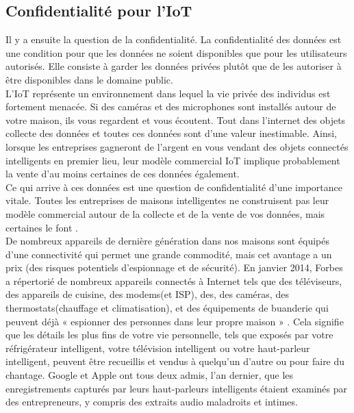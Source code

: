 	\subsection{Conf{\kern0pt}identialité pour l’IoT}
Il y a ensuite la question de la conf{\kern0pt}identialité. La conf{\kern0pt}identialité des données est une condition pour que les données ne soient disponibles que pour les utilisateurs autorisés. Elle consiste à garder les données privées plutôt que de les autoriser à être disponibles dans le domaine public.\\

L’IoT représente un environnement dans lequel la vie privée des individus est fortement menacée. Si des caméras et des microphones sont installés autour de votre maison, ils vous regardent et vous écoutent. Tout dans l'internet des objets collecte des données et toutes ces données sont d’une valeur inestimable. Ainsi, lorsque les entreprises gagneront de l'argent en vous vendant des objets connectés intelligents en premier lieu, leur modèle commercial IoT implique probablement la vente d'au moins certaines de ces données également.\\

Ce qui arrive à ces données est une question de conf{\kern0pt}identialité d'une importance vitale. Toutes les entreprises de maisons intelligentes ne construisent pas leur modèle commercial autour de la collecte et de la vente de vos données, mais certaines le font \cite{ranger2020iot}.\\

De nombreux appareils de dernière génération dans nos maisons sont équipés d'une connectivité qui permet une grande commodité, mais cet avantage a un prix (des risques potentiels d'espionnage et de sécurité). En janvier 2014, Forbes a répertorié de nombreux appareils connectés à Internet tels que des téléviseurs, des appareils de cuisine, des modems(et ISP), des, des caméras, des thermostats(chauf{\kern0pt}fage et climatisation), et des équipements de buanderie qui peuvent déjà « espionner des personnes dans leur propre maison » \cite{steinberg2014spying}. Cela signif{\kern0pt}ie que les détails les plus f{\kern0pt}ins de votre vie personnelle, tels que exposés par votre réfrigérateur intelligent, votre télévision intelligent ou votre haut-parleur intelligent, peuvent être recueillis et vendus à quelqu'un d'autre ou pour faire du chantage. Google et Apple ont tous deux admis, l'an dernier, que les enregistrements capturés par leurs haut-parleurs intelligents étaient examinés par des entrepreneurs, y compris des extraits audio maladroits et intimes.\\

